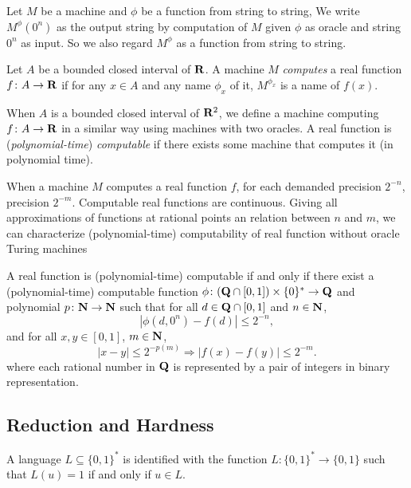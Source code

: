 Let $M$ be a machine and $\phi$ be a function from string to string,
We write $M ^\phi (0 ^n)$ as the output string by computation of $M$ given
$\phi$ as oracle and string $0^n$ as input.
So we also regard $M^\phi$ as a function from string to string.

\begin{definition}
Let $A$ be a bounded closed interval of $\mathbf R$.
A machine $M$ \emph{computes} a real function $f \colon A \to \mathbf R$ 
if for any $x \in A$ and any name $\phi_x$ of it,
$M^{\phi_x}$ is a name of $f(x)$.
\end{definition}

When $A$ is a bounded closed interval of $\mathbf R ^2$,
we define a machine computing $f \colon A \to \mathbf R$ in a similar way using machines with two oracles.
A real function is (\emph{polynomial-time}) \emph{computable} if there exists some machine that computes it (in polynomial time).

When a machine $M$ computes a real function $f$,
for each demanded precision $2^{-n}$,
 precision $2^{-m}$.
Computable real functions are continuous.
Giving all approximations of functions at rational points an relation between $n$ and $m$,
we can characterize (polynomial-time) computability of real function
without oracle Turing machines

\begin{lemma}
 \label{lem:type1representation}
 A real function is (polynomial-time) computable if and only if
 there exist a (polynomial-time) computable function 
 $\phi \colon (\mathbf Q \cap [0, 1]) \times \{0\} ^* \to \mathbf Q$ and 
 polynomial $p \colon \mathbf N \to \mathbf N$ such that
 for all $d \in \mathbf Q \cap [0,1]$ and $n \in \mathbf N$,
 \begin{equation}
  |\phi(d, 0^n) - f(d)| \le 2^{-n},
 \end{equation}
 and for all $x, y \in [0, 1]$, $m \in \mathbf N$,
 \begin{equation}
  |x-y| \le 2^{-p(m)} \Rightarrow |f(x) - f(y)| \le 2^{-m}.
 \end{equation}
 where each rational number in $\mathbf Q$ is represented by a pair of integers in binary representation.
\end{lemma}

\subsection{Reduction and Hardness}
A language $L \subseteq \{0, 1\} ^*$ is identified with the function
$L \colon \{0, 1\} ^* \to \{0, 1\}$ such that $L (u) = 1$ if and only if $u \in L$.

